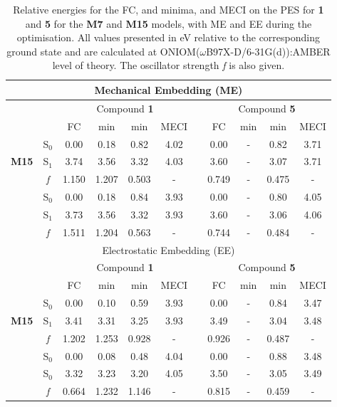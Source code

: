 \begin{table}
\caption[Relative energies with and without electrostatic embedding in monomer models]{Relative energies for the FC, \Estar{} and \Kstar{} minima, and MECI on the PES for \textbf{1} and \textbf{5} for the \textbf{M7} and \textbf{M15} models, with ME and EE during the optimisation. All values presented in eV relative to the corresponding ground state and are calculated at ONIOM($\omega$B97X-D/6-31G(d)):AMBER level of theory. The oscillator strength \textit{f} is also given.}
\label{table: ONIOM_comparison}
\centering
\begin{tabular}{ccccccccccc} 
\hline
\multicolumn{11}{c}{ Mechanical Embedding (ME) } \\
\hline
&  & \multicolumn{4}{c}{ Compound \textbf{1} } & & \multicolumn{4}{c}{ Compound \textbf{5} } \\
\hline
\multicolumn{2}{c}{} & FC & \Estar{}min & \Kstar{}min & MECI & & FC & \Estar{}min & \Kstar{}min & MECI \\
\hline
\multirow{3}{*}{ \textbf{M15} } & 
S$_{0}$& 0.00 & 0.18 & 0.82 & 4.02 & & 0.00 & - & 0.82 & 3.71 \\ 
& S$_{1}$& 3.74 & 3.56 & 3.32 & 4.03 & & 3.60 & - & 3.07 & 3.71 \\
& \textit{f}& 1.150 & 1.207 & 0.503& - & & 0.749&- &0.475& - \\
\hdashline
\multirow{3}{*}{ \textbf{M7} } & S$_{0}$ & 0.00 & 0.18 & 0.84 & 3.93 & & 0.00 & - & 0.80 & 4.05 \\
& S$_{1}$ & 3.73 & 3.56 & 3.32 & 3.93 & & 3.60 & - & 3.06 & 4.06 \\
& \textit{f}  & 1.511 &1.204 &0.563  & - & & 0.744&- &0.484&-\\

\hline
\multicolumn{11}{c}{ Electrostatic Embedding (EE) } \\
\hline
&  & \multicolumn{4}{c}{ Compound \textbf{1} } & & \multicolumn{4}{c}{ Compound \textbf{5} } \\
\hline
\multicolumn{2}{c}{} & FC & \Estar{}min & \Kstar{}min & MECI & & FC & \Estar{}min & \Kstar{}min & MECI \\
\hline
\multirow{3}{*}{ \textbf{M15} } & S$_{0}$ & 0.00 & 0.10 & 0.59 & 3.93 & & 0.00 & - & 0.84 & 3.47 \\
& S$_{1}$ & 3.41 & 3.31 & 3.25 & 3.93 & & 3.49 & - & 3.04 & 3.48 \\
& \textit{f} & 1.202 & 1.253 &0.928 &- & &0.926&-&0.487&- \\
\hdashline
\multirow{3}{*}{ \textbf{M7} } & S$_{0}$ & 0.00 & 0.08 & 0.48 & 4.04 &  & 0.00 & - & 0.88 & 3.48 \\
& S$_{0}$ & 3.32 & 3.23 & 3.20 & 4.05 & & 3.50 & - & 3.05 & 3.49 \\
& \textit{f} &  0.664 & 1.232 & 1.146 & -& &0.815 &-&0.459&-\\
\hline
\end{tabular}
\end{table}

